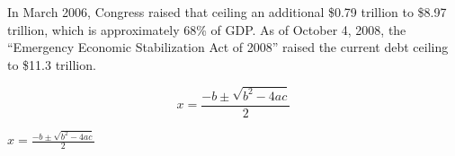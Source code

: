 \documentclass{article}
\begin{document}
In March 2006, Congress raised that ceiling an 
additional \$0.79 trillion to \$8.97 trillion,
which is approximately 68\% of GDP. As of October
4, 2008, the ``Emergency Economic Stabilization
Act of 2008'' raised the current debt ceiling
to \$11.3 trillion.

\begin{equation}
    x = \frac{-b \pm \sqrt{b^2 - 4ac}}{2}
\end{equation}

    $x = \frac{-b \pm \sqrt{b^2 - 4ac}}{2}$
\end{document}
